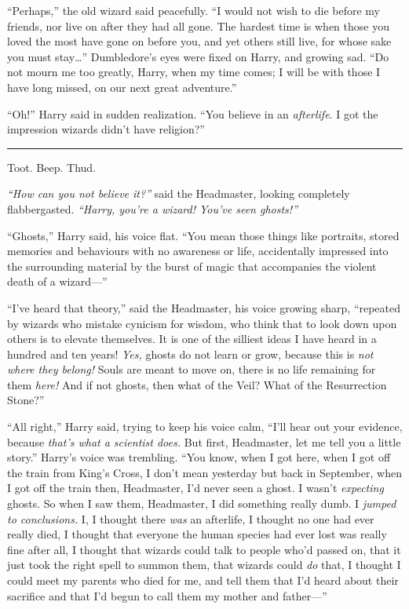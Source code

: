 ``Perhaps,'' the old wizard said peacefully. ``I would not wish to die
before my friends, nor live on after they had all gone. The hardest time
is when those you loved the most have gone on before you, and yet others
still live, for whose sake you must stay\ldots{}'' Dumbledore's eyes
were fixed on Harry, and growing sad. ``Do not mourn me too greatly,
Harry, when my time comes; I will be with those I have long missed, on
our next great adventure.''

``Oh!'' Harry said in sudden realization. ``You believe in an
\emph{afterlife}. I got the impression wizards didn't have religion?''

\begin{center}\rule{3in}{0.4pt}\end{center}

Toot. Beep. Thud.

\emph{``How can you not believe it?''} said the Headmaster, looking
completely flabbergasted. \emph{``Harry, you're a wizard! You've seen
ghosts!''}

``Ghosts,'' Harry said, his voice flat. ``You mean those things like
portraits, stored memories and behaviours with no awareness or life,
accidentally impressed into the surrounding material by the burst of
magic that accompanies the violent death of a wizard---''

``I've heard that theory,'' said the Headmaster, his voice growing
sharp, ``repeated by wizards who mistake cynicism for wisdom, who think
that to look down upon others is to elevate themselves. It is one of the
silliest ideas I have heard in a hundred and ten years! \emph{Yes,}
ghosts do not learn or grow, because this is \emph{not where they
belong!} Souls are meant to move on, there is no life remaining for them
\emph{here!} And if not ghosts, then what of the Veil? What of the
Resurrection Stone?''

``All right,'' Harry said, trying to keep his voice calm, ``I'll hear
out your evidence, because \emph{that's what a scientist does.} But
first, Headmaster, let me tell you a little story.'' Harry's voice was
trembling. ``You know, when I got here, when I got off the train from
King's Cross, I don't mean yesterday but back in September, when I got
off the train then, Headmaster, I'd never seen a ghost. I wasn't
\emph{expecting} ghosts. So when I saw them, Headmaster, I did something
really dumb. I \emph{jumped to conclusions.} I, I thought there
\emph{was} an afterlife, I thought no one had ever really died, I
thought that everyone the human species had ever lost was really fine
after all, I thought that wizards could talk to people who'd passed on,
that it just took the right spell to summon them, that wizards could
\emph{do} that, I thought I could meet my parents who died for me, and
tell them that I'd heard about their sacrifice and that I'd begun to
call them my mother and father---''

